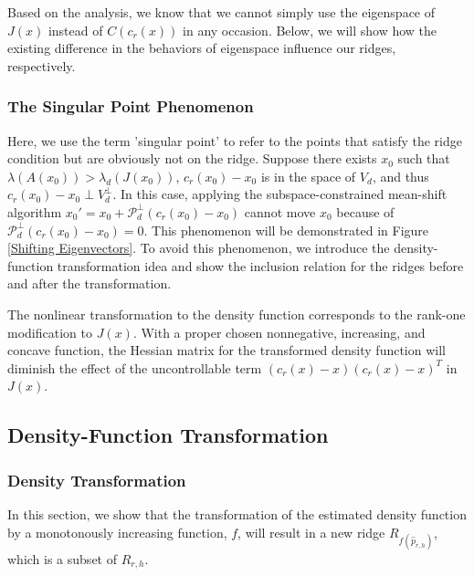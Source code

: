 \documentclass[aos,preprint]{imsart}
\theoremstyle{remark}
\begin{document}
Based on the analysis, we know that we cannot simply use the eigenspace of $J(x)$ instead of $C(c_r(x))$ in any occasion. Below, we will show how the existing difference in the behaviors of eigenspace influence our ridges, respectively.
\subsubsection{The Singular Point Phenomenon}
Here, we use the term 'singular point' to refer to the points that satisfy the ridge condition but are obviously not on the ridge.
Suppose there exists $x_0$ such that $\lambda(A(x_0))>\lambda_d(J(x_0))$, $c_r(x_0)-x_0$ is in the space of $V_d$, and thus $c_r(x_0)-x_0\perp { V}_d^\perp$. In this case, applying the subspace-constrained mean-shift algorithm $x_0' = x_0+{\mathcal P}_d^{\perp} (c_r(x_0)-x_0) $ cannot move $x_0$ because of ${\mathcal P}_d^\perp(c_r(x_0)-x_0) =0$. This phenomenon will be demonstrated in Figure \ref{Shifting Eigenvectors}. To avoid this phenomenon, we introduce the density-function transformation idea and show the inclusion relation for the ridges before and after the transformation.

The nonlinear transformation to the density function corresponds to the rank-one modification to $J(x)$. With a proper chosen nonnegative, increasing, and concave function, the Hessian matrix for the transformed density function will diminish the effect of the uncontrollable term $(c_r(x)-x)(c_r(x)-x)^T$ in $J(x)$.
\subsection{Density-Function Transformation}
\subsubsection{Density Transformation}
In this section, we show that the transformation of the estimated density function by a monotonously increasing function, $f$, will result in a new ridge $R_{f(\hat{p}_{r, h})}$, which is a subset of $R_{r, h}$.
\end{document}
